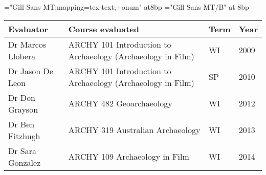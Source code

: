 \documentclass[11pt,article,oneside,oldfontcommands]{memoir}
\begin{document}
\newpage



\begin{center}

\begin{minipage*}{15cm} %

\begin{Spacing}{0.7}

\def\mainfont{Gill Sans MT}
\font\bodyfont="\mainfont:mapping=tex-text;+onum" at8bp \let\tenrm\bodyfont
\font\boldfont="\mainfont/B" at 8bp \let\tenbf\boldfont
\bodyfont

\def\arraystretch{1}%
    \begin{tabular}{ p{3cm} p{5cm} L{1cm} L{1cm}   }
    
   Evaluator  &  Course evaluated  &  Term  &  Year \\
 \midrule
Dr Marcos Llobera & ARCHY 101 Introduction to Archaeology (Archaeology in Film)  &  WI  &  2009   \\
Dr Jason De Leon  &  ARCHY 101 Introduction to Archaeology (Archaeology in Film)  &  SP  &  2010   \\
Dr Don Grayson  &  ARCHY 482 Geoarchaeology  &  WI  &  2012   \\
Dr Ben Fitzhugh  &  ARCHY 319 Australian Archaeology  &  WI  &  2013   \\
Dr Sara Gonzalez  &  ARCHY 109 Archaeology in Film  &  WI  &  2014   \\
 \bottomrule
    \end{tabular}

\end{Spacing}
\end{minipage*}

\end{center}
\end{document}
